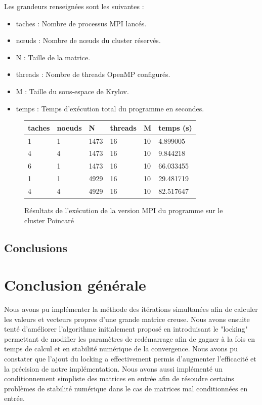 \documentclass[11pt,a4paper]{article}
\begin{document}
			Les grandeurs renseignées sont les suivantes :
			\begin{itemize}
				\item taches : Nombre de processus MPI lancés.
				\item n\oe{}uds : Nombre de n\oe{}uds du cluster réservés.
				\item N : Taille de la matrice.
				\item threads : Nombre de threads OpenMP configurés.
				\item M : Taille du sous-espace de Krylov.
				\item temps : Temps d'exécution total du programme en secondes.
			\end{itemize}

			\begin{figure}
				\begin{center}
					\begin{tabular}{l l l l l l}
						taches	& noeuds & N & threads & M & temps (s)\\ \hline
						1 		& 1 & 1473 & 16 & 10 & 4.899005\\
						4 		& 4 & 1473 & 16 & 10 & 9.844218\\
						6 		& 1 & 1473 & 16 & 10 & 66.033455\\ \hline
						1 & 1 & 4929 & 16 & 10 & 29.481719\\
						4 & 4 & 4929 & 16 & 10 & 82.517647\\
					\end{tabular}
				\end{center}
				\caption{Résultats de l'exécution de la version MPI du programme sur le cluster Poincaré}
				\label{res-mpi}
			\end{figure}

			

	\subsection{Conclusions}

\section{Conclusion générale}

	Nous avons pu implémenter la méthode des itérations simultanées afin de calculer les valeurs et vecteurs propres d'une grande matrice creuse. Nous avons ensuite tenté d'améliorer l'algorithme initialement proposé en introduisant le "locking" permettant de modifier les paramètres de redémarrage afin de gagner à la fois en temps de calcul et en stabilité numérique de la convergence. Nous avons pu constater que l'ajout du locking a effectivement permis d'augmenter l'efficacité et la précision de notre implémentation. Nous avons aussi implémenté un conditionnement simpliste des matrices en entrée afin de résoudre certains problèmes de stabilité numérique dans le cas de matrices mal conditionnées en entrée.
\end{document}
